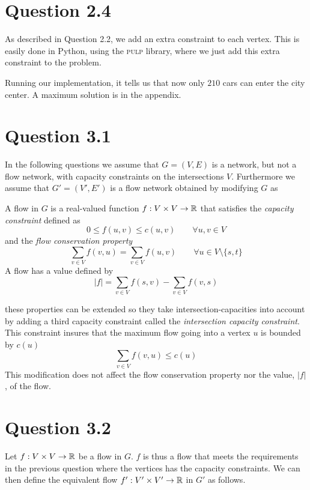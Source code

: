 \documentclass[10pt]{article}
\begin{document}
\section*{Question 2.4} %
\label{sec:question_2_4}
As described in Question 2.2, we add an extra constraint to each vertex.
This is easily done in Python, using the \textsc{pulp} library, where we just add this extra constraint to the problem.

Running our implementation, it tells us that now only $210$ cars can enter the city center.
A maximum solution is in the appendix.


\section*{Question 3.1} %
\label{sec:question_3_1}
In the following questions we assume that $G = (V,E)$ is a network, but not a flow network, with capacity constraints on the intersections $V$. Furthermore we assume that $G' = (V',E')$ is a flow network obtained by modifying $G$ as 

A flow in $G$ is a real-valued function $f: V \times V \rightarrow \mathbb R$ that satisfies the \emph{capacity constraint} defined as
\begin{equation}
 0 \leq f(u,v) \leq c(u,v) \qquad  \forall u,v \in V
\end{equation}
and the \emph{flow conservation property}
\begin{equation}
\sum_{v \in V} f(v,u) = \sum_{v \in V} f(u,v)  \qquad \forall u \in V \setminus \{s,t\}
\end{equation}
A flow has a value defined by
\begin{equation}
 |f| = \sum_{v \in V} f(s,v) - \sum_{v \in V} f(v,s)
\end{equation}

these properties can be extended so they take intersection-capacities into account by adding a third capacity constraint called the \emph{intersection capacity constraint}. This constraint insures that the maximum flow going into a vertex $u$ is bounded by $c(u)$
\begin{equation}
\sum_{v \in V} f(v,u) \leq c(u) 
\end{equation}
This modification does not affect the flow conservation property nor the value, $|f|$, of the flow.


\section*{Question 3.2} %
\label{sec:question_3_2}
Let $f: V \times V \rightarrow \mathbb R$ be a flow in $G$. $f$ is thus a flow that meets the requirements in the previous question where the vertices has the capacity constraints. We can then define the equivalent flow $f': V' \times V' \rightarrow \mathbb R$ in $G'$ as follows. 
\end{document}
